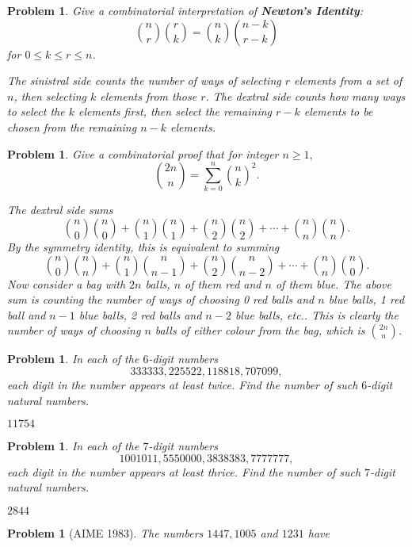 \documentclass[11pt, openany]{book}
\theoremstyle{change} \theoremheaderfont{\blue\sffamily\bfseries}
\newtheorem{pro}[thm]{Problem}
\theoremstyle{nonumberplain} \theoremheaderfont{\sffamily\bfseries}
\def\binom#1#2{{#1\choose#2}}
\newcommand{\í}{\'{\i}}
\begin{document}
\begin{multicols}{2}
\begin{pro} Give a combinatorial interpretation of {\bf Newton's Identity}: \begin{equation} \binom{n}{r} \binom{r}{k} = \binom{n}{k}
\binom{n - k}{r - k}\end{equation} for $0 \leq k \leq r \leq n$.
\begin{answer} The sinistral side counts the number of ways of selecting $r$
elements from a set of $n$, then selecting $k$ elements from those
$r$.  The dextral side counts how many ways to select the $k$
elements first, then select the remaining $r - k$ elements to be
chosen from the remaining $n - k$ elements.
\end{answer}
\end{pro}
\begin{pro} Give a combinatorial proof that for integer $n \geq 1,$ $$ \binom{2n}{n} =
\sum _{k = 0} ^n \binom{n}{k} ^2 .$$ \begin{answer} The dextral side
sums
$$\binom{n}{0} \binom{n}{0} + \binom{n}{1} \binom{n}{1} +
\binom{n}{2} \binom{n}{2} + \cdots + \binom{n}{n} \binom{n}{n}.$$ By
the symmetry identity, this is equivalent to summing $$\binom{n}{0}
\binom{n}{n} + \binom{n}{1} \binom{n}{n - 1} + \binom{n}{2}
\binom{n}{n - 2} + \cdots + \binom{n}{n} \binom{n}{0}.$$Now consider
a bag with $2n$ balls, $n$ of them red and $n$ of them blue. The
above sum is counting the number of ways of choosing 0 red balls and
$n$ blue balls, 1 red ball and $n - 1$ blue balls, 2 red balls and
$n - 2$ blue balls, etc.. This is clearly the number of ways of
choosing $n$ balls of either colour from the bag, which is
${\binom{2n}{n}}$.
\end{answer}
\end{pro}
   \begin{pro}
In each of the $6$-digit numbers
$$333333, 225522, 118818, 707099,$$each digit in the number
appears at least twice. Find the number of such $6$-digit natural
numbers.
\begin{answer}$11754$
\end{answer}
 \end{pro}
  \begin{pro}
In each of the $7$-digit numbers $$1001011, 5550000, 3838383,
7777777,$$each digit in the number appears at least thrice. Find the
number of such $7$-digit natural numbers.
\begin{answer} $2844$
\end{answer}
 \end{pro}
  \begin{pro}[AIME 1983]  The numbers $1447, 1005$ and $1231$ have

\end{pro}
\end{multicols}
\end{document}
